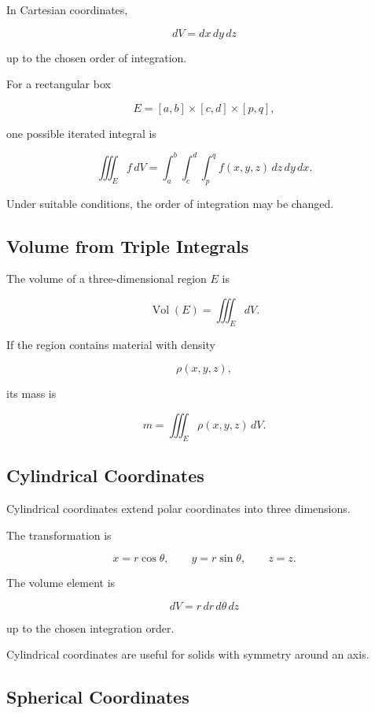 In Cartesian coordinates,

\[ dV=dx\,dy\,dz \]

up to the chosen order of integration.

For a rectangular box

\[ E=[a,b]\times[c,d]\times[p,q], \]

one possible iterated integral is

\[ \iiint_Ef\,dV
=
\int_a^b\int_c^d\int_p^q
f(x,y,z)\,dz\,dy\,dx. \]

Under suitable conditions, the order of integration may be changed.

\subsection{Volume from Triple Integrals}
\label{subsec:volume-triple-integral}

The volume of a three-dimensional region \(E\) is

\[ \boxed{\operatorname{Vol}(E)=\iiint_E dV.} \]

If the region contains material with density

\[ \rho(x,y,z), \]

its mass is

\[ m=\iiint_E\rho(x,y,z)\,dV. \]

\subsection{Cylindrical Coordinates}
\label{subsec:cylindrical-coordinates}

Cylindrical coordinates extend polar coordinates into three dimensions.

The transformation is

\[ x=r\cos\theta,\qquad y=r\sin\theta,\qquad z=z. \]

The volume element is

\[ \boxed{dV=r\,dr\,d\theta\,dz} \]

up to the chosen integration order.

Cylindrical coordinates are useful for solids with symmetry around an axis.

\subsection{Spherical Coordinates}
\label{subsec:spherical-coordinates}

